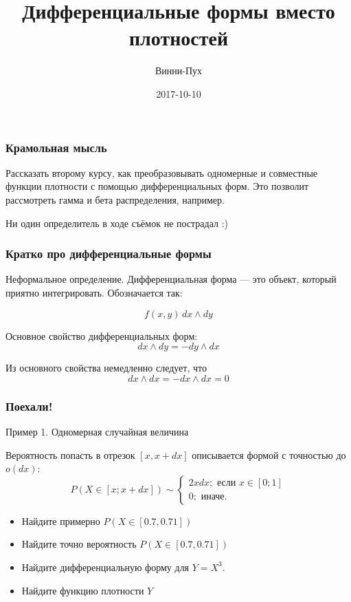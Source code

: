 \documentclass[11pt,russian,]{article}
\title{Дифференциальные формы вместо плотностей}
\author{Винни-Пух}
\date{2017-10-10}
\providecommand{\tightlist}{%
  \setlength{\itemsep}{0pt}\setlength{\parskip}{0pt}}
\begin{document}
\maketitle

{
\setcounter{tocdepth}{2}
\tableofcontents
}
\subsubsection{Крамольная мысль}\label{-}

Рассказать второму курсу, как преобразовывать одномерные и совместные
функции плотности с помощью дифференциальных форм. Это позволит
рассмотреть гамма и бета распределения, например.

Ни один определитель в ходе съёмок не пострадал :)

\subsubsection{Кратко про дифференциальные формы}\label{---}

Неформальное определение. Дифференциальная форма --- это объект, который
приятно интегрировать. Обозначается так:

\[
f(x, y) \, dx \wedge dy
\]

Основное свойство дифференциальных форм: \[
dx \wedge dy = - dy \wedge dx
\]

Из основного свойства немедленно следует, что \[
dx \wedge dx = - dx \wedge dx = 0
\]

\subsubsection{Поехали!}

Пример 1. Одномерная случайная величина

Вероятность попасть в отрезок \([x, x+dx]\) описывается формой с
точностью до \(o(dx)\): \[
P(X \in [x; x+dx]) \sim \begin{cases}
2x dx; \text{ если } x\in [0;1] \\
0; \text{ иначе.}
\end{cases}
\]

\begin{itemize}
\tightlist
\item
  Найдите примерно \(P(X \in [0.7, 0.71])\)
\item
  Найдите точно вероятность \(P(X \in [0.7, 0.71])\)
\item
  Найдите дифференциальную форму для \(Y=X^3\).
\item
  Найдите функцию плотности \(Y\)
\end{itemize}
\end{document}

